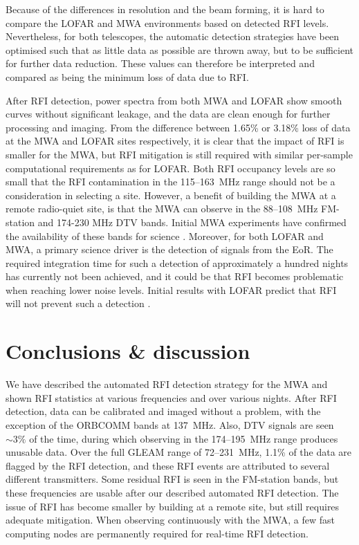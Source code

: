 \documentclass{pasa}
\begin{document}
Because of the differences in resolution and the beam forming, it is hard to compare the LOFAR and MWA environments based on detected RFI levels. Nevertheless, for both telescopes, the automatic detection strategies have been optimised such that as little data as possible are thrown away, but to be sufficient for further data reduction. These values can therefore be interpreted and compared as being the minimum loss of data due to RFI.

After RFI detection, power spectra from both MWA and LOFAR show smooth curves without significant leakage, and the data are clean enough for further processing and imaging. From the difference between 1.65\% or 3.18\% loss of data at the MWA and LOFAR sites respectively, it is clear that the impact of RFI is smaller for the MWA, but RFI mitigation is still required with similar per-sample computational requirements as for LOFAR. Both RFI occupancy levels are so small that the RFI contamination in the 115--163~MHz range should not be a consideration in selecting a site. However, a benefit of building the MWA at a remote radio-quiet site, is that the MWA can observe in the 88--108~MHz FM-station and 174-230 MHz DTV bands. Initial MWA experiments have confirmed the availability of these bands for science \citep{mckinley-moon-2013,mwacs-2014}. Moreover, for both LOFAR and MWA, a primary science driver is the detection of signals from the EoR. The required integration time for such a detection of approximately a hundred nights has currently not been achieved, and it could be that RFI becomes problematic when reaching lower noise levels. Initial results with LOFAR predict that RFI will not prevent such a detection \citep{ncp-eor-yatawatta, offringa-rfi-distributions}.

\section{Conclusions \& discussion} \label{ch:conclusions-and-discussion}
We have described the automated RFI detection strategy for the MWA and shown RFI statistics at various frequencies and over various nights. After RFI detection, data can be calibrated and imaged without a problem, with the exception of the ORBCOMM bands at 137~MHz. Also, DTV signals are seen $\sim3\%$ of the time, during which observing in the 174--195~MHz range produces unusable data. Over the full GLEAM range of 72--231~MHz, 1.1\% of the data are flagged by the RFI detection, and these RFI events are attributed to several different transmitters. Some residual RFI is seen in the FM-station bands, but these frequencies are usable after our described automated RFI detection. The issue of RFI has become smaller by building at a remote site, but still requires adequate mitigation. When observing continuously with the MWA, a few fast computing nodes are permanently required for real-time RFI detection.
\end{document}
